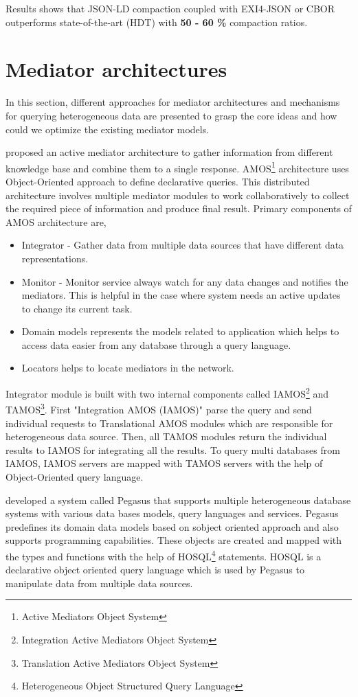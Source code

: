 	Results shows that JSON-LD compaction coupled with EXI4-JSON or CBOR outperforms state-of-the-art (HDT) with \textbf{50 - 60 \% }compaction ratios.
	
	\section{Mediator architectures}
    In this section, different approaches for mediator architectures and mechanisms for querying heterogeneous data are presented to grasp the core ideas and how could we optimize the existing mediator models.
	
	\citet{fahl1993amos} proposed an active mediator architecture to gather information from different knowledge base and combine them to a single response. AMOS\footnote{\label{amos}Active Mediators Object System} architecture uses Object-Oriented approach to define declarative queries. This distributed architecture involves multiple mediator modules to work collaboratively to collect the required piece of information and produce final result. Primary components of AMOS architecture are,
	\begin{itemize}
		\item Integrator - Gather data from multiple data sources that have different data representations.
		\item Monitor - Monitor service always watch for any data changes and notifies the mediators. This is helpful in the case where system needs an active updates to change its current task.
		\item Domain models represents the models related to application which helps to access data easier from any database through a query language.
		\item Locators helps to locate mediators in the network.
	\end{itemize}
	
	
	Integrator module is built with two internal components called IAMOS\footnote{\label{amos}Integration Active Mediators Object System} and TAMOS\footnote{\label{amos}Translation Active Mediators Object System}. 
	First "Integration AMOS (IAMOS)" parse the query and send individual requests to Translational AMOS modules which are responsible for heterogeneous data source.
	Then, all TAMOS modules return the individual results to IAMOS for integrating all the results. To query multi databases from IAMOS, IAMOS servers are mapped with TAMOS servers with the help of Object-Oriented query language.
	
	\citet{ahmed1991pegasus} developed a system called Pegasus that supports multiple heterogeneous database systems with various data bases models, query languages and services. Pegasus predefines its domain data models based on sobject oriented approach and also supports programming capabilities. These objects are created and mapped with the types and functions with the help of HOSQL\footnote{\label{myfootnote}Heterogeneous Object Structured Query Language} statements. HOSQL is a declarative object oriented query language which is used by Pegasus to manipulate data from multiple data sources.
	
